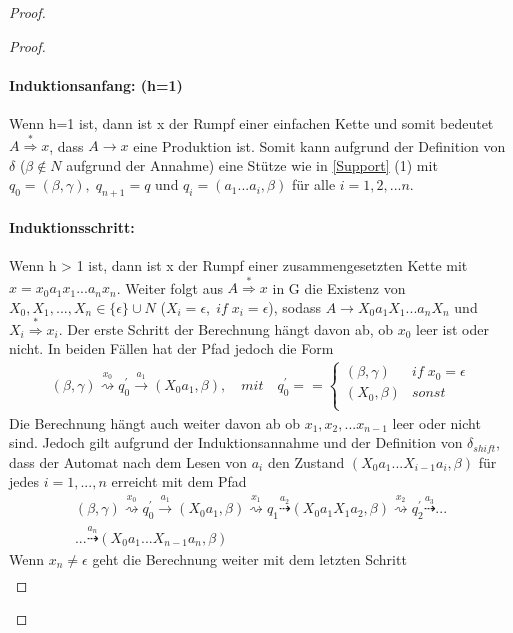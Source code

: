 \begin{proof}
\begin{proof}
\paragraph*{Induktionsanfang: (h=1)}
Wenn h=1 ist, dann ist x der Rumpf einer einfachen Kette und somit bedeutet $A \stackrel{*} {\Rightarrow} x$, dass $A \rightarrow x$ eine Produktion ist. Somit kann aufgrund der Definition von $\delta$ ($\beta \notin N$ aufgrund der Annahme) eine Stütze wie in \autoref{Support} (1) mit $q_0=(\beta, \gamma), \; q_{n+1}=q$ und $q_i=(a_1...a_i, \beta)$ für alle $i=1,2,...n$.
\paragraph*{Induktionsschritt:}
Wenn h > 1 ist, dann ist x der Rumpf einer zusammengesetzten Kette mit $x=x_0a_1x_1...a_nx_n$. Weiter folgt aus $A\stackrel{*}{\Rightarrow}x$ in G die Existenz von $X_0, X_1, ...,X_n \in \{\epsilon\}\cup N$ ($X_i = \epsilon, \; if \; x_i=\epsilon$), sodass $A\rightarrow X_0a_1X_1...a_nX_n$ und $X_i \stackrel{*}{\Rightarrow}x_i$. Der erste Schritt der Berechnung hängt davon ab, ob $x_0$ leer ist oder nicht. In beiden Fällen hat der Pfad jedoch die Form
\begin{eqnarray*}
(\beta, \gamma) \stackrel{x_0}{\rightsquigarrow} q_0^\prime \stackrel{a_1}{\rightarrow} (X_0a_1, \beta), \quad mit \quad q_0^\prime= = \begin{cases}
(\beta, \gamma) & if \; x_0 = \epsilon \\
(X_0, \beta) & sonst \\
\end{cases}
\end{eqnarray*}
Die Berechnung hängt auch weiter davon ab ob $x_1, x_2,...x_{n-1}$ leer oder nicht sind. Jedoch gilt aufgrund der Induktionsannahme und der Definition von $\delta_{shift}$, dass der Automat nach dem Lesen von $a_i$ den Zustand $(X_0a_1...X_{i-1}a_i, \beta)$ für jedes $i=1,...,n$ erreicht mit dem Pfad 
\begin{multline*}
(\beta, \gamma) \stackrel{x_0}{\rightsquigarrow} q_0^\prime \stackrel{a_1}{\rightarrow} (X_0a_1, \beta) \stackrel{x_1}{\rightsquigarrow}q_1 \stackrel{a_2}{\dashrightarrow}(X_0a_1X_1a_2, \beta) \stackrel{x_2}{\rightsquigarrow} q_2^\prime \stackrel{a_3}{\dashrightarrow}... \\
...\stackrel{a_n}{\dashrightarrow} (X_0a_1...X_{n-1}a_n, \beta)
\end{multline*}
Wenn $x_n \neq \epsilon$ geht die Berechnung weiter mit dem letzten Schritt
\begin{eqnarray*}

\end{eqnarray*}
\end{proof}
\end{proof}

